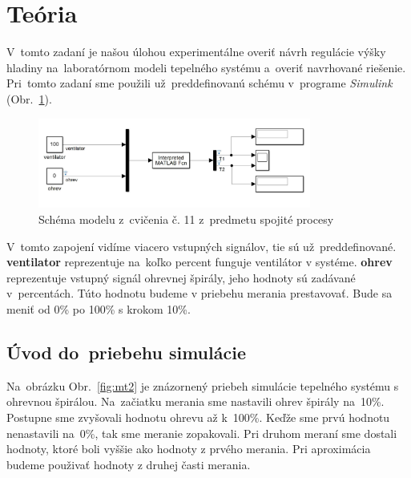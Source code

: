 \documentclass{article}
\begin{document}
\section{Teória}
\label{sec:teoria}

V~tomto zadaní je našou úlohou experimentálne overiť návrh regulácie výšky hladiny na~laboratórnom
modeli tepelného systému a~overiť navrhované riešenie. Pri~tomto zadaní sme použili už~preddefinovanú schému
v~programe \textit{Simulink} (Obr.~\ref{fig:schema}).

\begin{figure}[!htbp]
	\begin{center}
		\includegraphics[width=0.8\textwidth]{./include/schema.png}
	\end{center}
	\caption{Schéma modelu z~cvičenia č. 11 z~predmetu spojité procesy}
	\label{fig:schema}
\end{figure}

V~tomto zapojení vidíme viacero vstupných signálov, tie sú už~preddefinované. \textbf{ventilator} reprezentuje
na~koľko percent funguje ventilátor v systéme. \textbf{ohrev} reprezentuje vstupný signál ohrevnej špirály,
jeho hodnoty sú zadávané v~percentách. Túto hodnotu budeme v priebehu merania prestavovať. Bude sa meniť
od 0\% po 100\% s krokom 10\%.

\clearpage

\subsection{Úvod do~priebehu simulácie}
\label{subsec:priebehSimulacie}

Na~obrázku Obr.~\ref{fig:mt2} je znázornený priebeh simulácie tepelného systému s ohrevnou špirálou. Na~začiatku
merania sme nastavili ohrev špirály na~10\%. Postupne sme zvyšovali hodnotu ohrevu až k~100\%. Keďže sme prvú
hodnotu nenastavili na~0\%, tak sme meranie zopakovali. Pri druhom meraní sme dostali hodnoty, ktoré boli vyššie
ako hodnoty z prvého merania. Pri aproximácia budeme použivať hodnoty z druhej časti merania.
\end{document}
